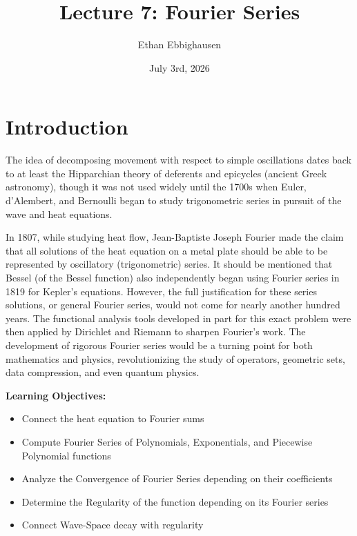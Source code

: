 \documentclass{article}
\title{Lecture 7: Fourier Series}
\author{Ethan Ebbighausen}
\date{July 3rd, 2026}
\begin{document}
	\pagestyle{fancy}
	\fancyfoot{} 
	
	\maketitle
	
	\section{Introduction}
	
	The idea of decomposing movement with respect to simple oscillations dates back to at least the Hipparchian theory of deferents and epicycles (ancient Greek astronomy), though it was not used widely until the 1700s when Euler, d'Alembert, and Bernoulli began to study trigonometric series in pursuit of the wave and heat equations. 
	
	In 1807, while studying heat flow, Jean-Baptiste Joseph Fourier made the claim that all solutions of the heat equation on a metal plate should be able to be represented by oscillatory (trigonometric) series. It should be mentioned that Bessel (of the Bessel function) also independently began using Fourier series in 1819 for Kepler's equations. However, the full justification for these series solutions, or general Fourier series, would not come for nearly another hundred years. The functional analysis tools developed in part for this exact problem were then applied by Dirichlet and Riemann to sharpen Fourier's work. The development of rigorous Fourier series would be a turning point for both mathematics and physics, revolutionizing the study of operators, geometric sets, data compression, and even quantum physics.   
	
	
	\textbf{Learning Objectives:}
	
	\begin{itemize}
		\item{Connect the heat equation to Fourier sums}
		\item{Compute Fourier Series of Polynomials, Exponentials, and Piecewise Polynomial functions}
		\item{Analyze the Convergence of Fourier Series depending on their coefficients}
		\item{Determine the Regularity of the function depending on its Fourier series}
		\item{Connect Wave-Space decay with regularity}
	\end{itemize}
	
	
\end{document}
